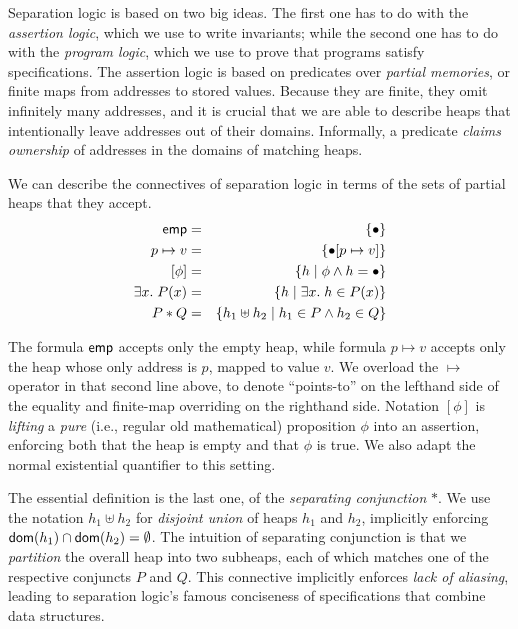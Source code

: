 \documentclass{amsbook}
\theoremstyle{definition}
\theoremstyle{remark}
\numberwithin{section}{chapter}
\numberwithin{equation}{chapter}
\begin{document}
Separation logic is based on two big ideas.
The first one has to do with the \emph{assertion logic}, which we use to write invariants; while the second one has to do with the \emph{program logic}, which we use to prove that programs satisfy specifications.
The assertion logic is based on predicates over \emph{partial memories}, or finite maps from addresses to stored values.
Because they are finite, they omit infinitely many addresses, and it is crucial that we are able to describe heaps that intentionally leave addresses out of their domains.
Informally, a predicate \emph{claims ownership} of addresses in the domains of matching heaps.

\newcommand{\emp}[0]{\mt{emp}}
\newcommand{\lift}[1]{[#1]}
\newcommand{\ptsto}[2]{#1 \mapsto #2}

We can describe the connectives of separation logic in terms of the sets of partial heaps that they accept.
\begin{eqnarray*}
  \emp &=& \{\mempty\} \\
  \ptsto{p}{v} &=& \{\mupd{\mempty}{p}{v}\} \\
  \lift{\phi} &=& \{h \mid \phi \land h = \mempty\} \\
  \exists x. \; P(x) &=& \{h \mid \exists x. \; h \in P(x)\} \\
  P * Q &=& \{h_1 \uplus h_2 \mid h_1 \in P \land h_2 \in Q\}
\end{eqnarray*}

The formula $\emp$ accepts only the empty heap, while formula $\ptsto{p}{v}$ accepts only the heap whose only address is $p$, mapped to value $v$.
We overload the $\mapsto$ operator in that second line above, to denote ``points-to'' on the lefthand side of the equality and finite-map overriding on the righthand side.
Notation $\lift{\phi}$ is \emph{lifting} a \emph{pure} (i.e., regular old mathematical) proposition $\phi$ into an assertion, enforcing both that the heap is empty and that $\phi$ is true.
We also adapt the normal existential quantifier to this setting.

The essential definition is the last one, of the \emph{separating conjunction} $*$.
We use the notation $h_1 \uplus h_2$ for \emph{disjoint union} of heaps $h_1$ and $h_2$, implicitly enforcing $\mathsf{dom}(h_1) \cap \mathsf{dom}(h_2) = \emptyset$.
The intuition of separating conjunction is that we \emph{partition} the overall heap into two subheaps, each of which matches one of the respective conjuncts $P$ and $Q$.
This connective implicitly enforces \emph{lack of aliasing}, leading to separation logic's famous conciseness of specifications that combine data structures.
\end{document}
